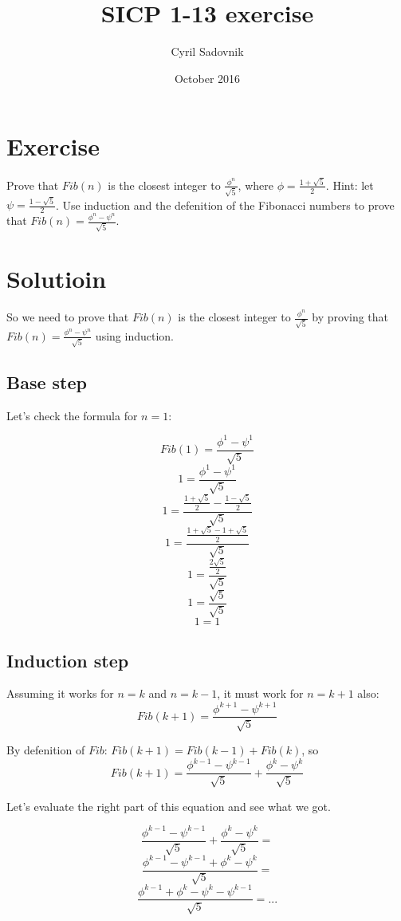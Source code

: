 \documentclass{article}
\title{SICP 1-13 exercise}
\author{Cyril Sadovnik }
\date{October 2016}
\begin{document}
\maketitle

\section{Exercise}

Prove that \(Fib(n)\) is the closest integer to \(\frac{\phi^n}{\sqrt 5}\), where \(\phi = \frac{1 + \sqrt 5}{2}\).
Hint: let \(\psi = \frac{1 - \sqrt 5}{2}\). Use induction and the defenition of the Fibonacci numbers to prove that \(Fib(n) = \frac{\phi^n - \psi^n}{\sqrt 5}\).

\section{Solutioin}
So we need to prove that \(Fib(n)\) is the closest integer to \(\frac{\phi^n}{\sqrt 5}\) by proving that \(Fib(n) = \frac{\phi^n - \psi^n}{\sqrt 5}\) using induction.

\subsection{Base step}

Let's check the formula for \(n = 1\):

\[ Fib(1) = \frac{\phi^1 - \psi^1}{\sqrt 5}\]
\[ 1 = \frac{\phi^1 - \psi^1}{\sqrt 5}\]
\[ 1 = \frac{\frac{1 + \sqrt 5}{2} - \frac{1 - \sqrt 5}{2}}{\sqrt 5}\]
\[ 1 = \frac{\frac{1 + \sqrt 5 - 1 + \sqrt 5}{2}}{\sqrt 5}\]
\[ 1 = \frac{\frac{2 \sqrt 5}{2}}{\sqrt 5}\]
\[ 1 = \frac{\sqrt 5}{\sqrt 5}\]
\[ 1 = 1\]

\subsection{Induction step}

Assuming it works for \(n = k\) and \(n = k - 1\), it must work for \(n = k + 1\) also:
\[ Fib(k + 1) = \frac{\phi^{k + 1} - \psi^{k + 1}}{\sqrt 5} \]

By defenition of \(Fib\): \(Fib(k + 1) = Fib(k - 1) + Fib(k)\), so
\[ Fib(k + 1) = \frac{\phi^{k - 1} - \psi^{k - 1}}{\sqrt 5} + \frac{\phi^k - \psi^k}{\sqrt 5} \]

Let's evaluate the right part of this equation and see what we got.

\[ \frac{\phi^{k - 1} - \psi^{k - 1}}{\sqrt 5} + \frac{\phi^k - \psi^k}{\sqrt 5} = \]
\[ \frac{\phi^{k - 1} - \psi^{k - 1} + \phi^k - \psi^k}{\sqrt 5} = \]
\[ \frac{\phi^{k - 1} + \phi^k - \psi^k - \psi^{k - 1}}{\sqrt 5} = ... \]
\end{document}
